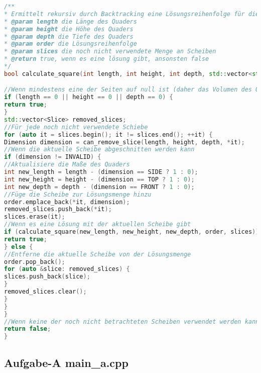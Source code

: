 \documentclass[a4paper,10pt,ngerman]{scrartcl}
\begin{document}
    \newpage

    \begin{lstlisting}[frame=single,language=C++,title=Methode calculate\_square,breaklines=true,label={lst:code_calculateSquare}]
/**
* Ermittelt rekursiv durch Backtracking eine Lösungsreihenfolge für die gegebene Menge an Scheiben.
* @param length die Länge des Quaders
* @param height die Höhe des Quaders
* @param depth die Tiefe des Quaders
* @param order die Lösungsreihenfolge
* @param slices die noch nicht verwendete Menge an Scheiben
* @return true, wenn es eine lösung gibt, ansonsten false
*/
bool calculate_square(int length, int height, int depth, std::vector<std::pair<Slice, Dimension>> &order, std::vector<Slice> &slices) {

//Wenn mindestens eine der Seiten auf null ist (daher das Volumen des Quaders null ist)
if (length == 0 || height == 0 || depth == 0) {
return true;
}
std::vector<Slice> removed_slices;
//Für jede noch nicht verwendete Schiebe
for (auto it = slices.begin(); it != slices.end(); ++it) {
Dimension dimension = can_remove_slice(length, height, depth, *it);
//Wenn die aktuelle Scheibe abgeschnitten werden kann
if (dimension != INVALID) {
//Aktualisiere die Maße des Quaders
int new_length = length - (dimension == SIDE ? 1 : 0);
int new_height = height - (dimension == TOP ? 1 : 0);
int new_depth = depth - (dimension == FRONT ? 1 : 0);
//Füge die Scheibe zur Lösungsmenge hinzu
order.emplace_back(*it, dimension);
removed_slices.push_back(*it);
slices.erase(it);
//Wenn es eine Lösung mit der aktuellen Scheibe gibt
if (calculate_square(new_length, new_height, new_depth, order, slices)) {
return true;
} else {
//Entferne die aktuelle Scheibe von der Lösungsmenge
order.pop_back();
for (auto &slice: removed_slices) {
slices.push_back(slice);
}
removed_slices.clear();
}
}
}
//Wenn keine der noch nicht betrachteten Scheiben verwendet werden kann
return false;
}
    \end{lstlisting}

    \newpage

    \subsection{Aufgabe-A main\_a.cpp}\label{subsec:alles-kaese}
\end{document}
